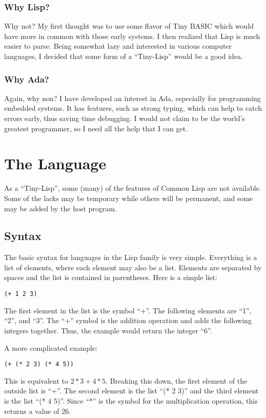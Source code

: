 \documentclass[10pt, openany]{book}
\begin{document}
\subsection{Why Lisp?}
Why not?  My first thought was to use some flavor of Tiny BASIC which would have more in common with those early systems.  I then realized that Lisp is much easier to parse.  Being somewhat lazy and interested in various computer languages, I decided that some form of a ``Tiny-Lisp'' would be a good idea.

\subsection{Why Ada?}
Again, why non?  I have developed an interest in Ada, especially for programming embedded systems.  It has features, such as strong typing, which can help to catch errors early, thus saving time debugging.  I would not claim to be the world's greatest programmer, so I need all the help that I can get.


\chapter{The Language}
As a ``Tiny-Lisp'', some (many) of the features of Common Lisp are not available.  Some of the lacks may be temporary while others will be permanent, and some may be added by the host program.

\section{Syntax}
The basic syntax for languages in the Lisp family is very simple.  Everything is a list of elements, where each element may also be a list.  Elements are separated by spaces and the list is contained in parentheses.  Here is a simple list:
\lstset{language=Lisp}
\begin{lstlisting}
(+ 1 2 3)
\end{lstlisting}
The first element in the list is the symbol ``+''.  The following elements are ``1'', ``2'', and ``3''.  The ``+'' symbol is the addition operation and adds the following integers together.  Thus, the example would return the integer ``6''.

A more complicated example:
\begin{lstlisting}
(+ (* 2 3) (* 4 5))
\end{lstlisting}
This is equivalent to $2*3+4*5$.  Breaking this down, the first element of the outside list is ``+''.  The second element is the list ``(* 2 3)'' and the third element is the list ``(* 4 5)''.  Since ``*'' is the symbol for the multiplication operation, this returns a value of 26.
\end{document}
